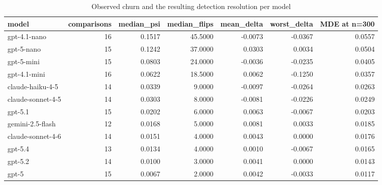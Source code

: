\begin{table}
\caption{Observed churn and the resulting detection resolution per model}
\label{tab:table-model-resolution}
\begin{tabular}{lrrrrrr}
\toprule
model & comparisons & median\_psi & median\_flips & mean\_delta & worst\_delta & MDE at n=300 \\
\midrule
gpt-4.1-nano & 16 & 0.1517 & 45.5000 & -0.0073 & -0.0367 & 0.0557 \\
gpt-5-nano & 15 & 0.1242 & 37.0000 & 0.0303 & 0.0034 & 0.0504 \\
gpt-5-mini & 15 & 0.0803 & 24.0000 & -0.0036 & -0.0235 & 0.0405 \\
gpt-4.1-mini & 16 & 0.0622 & 18.5000 & 0.0062 & -0.1250 & 0.0357 \\
claude-haiku-4-5 & 14 & 0.0339 & 9.0000 & -0.0097 & -0.0264 & 0.0263 \\
claude-sonnet-4-5 & 14 & 0.0303 & 8.0000 & -0.0081 & -0.0226 & 0.0249 \\
gpt-5.1 & 15 & 0.0202 & 6.0000 & 0.0063 & -0.0067 & 0.0203 \\
gemini-2.5-flash & 12 & 0.0168 & 5.0000 & 0.0081 & 0.0033 & 0.0185 \\
claude-sonnet-4-6 & 14 & 0.0151 & 4.0000 & 0.0043 & 0.0000 & 0.0176 \\
gpt-5.4 & 13 & 0.0134 & 4.0000 & 0.0010 & -0.0067 & 0.0165 \\
gpt-5.2 & 14 & 0.0100 & 3.0000 & 0.0041 & 0.0000 & 0.0143 \\
gpt-5 & 15 & 0.0067 & 2.0000 & 0.0042 & -0.0033 & 0.0117 \\
\bottomrule
\end{tabular}
\end{table}

